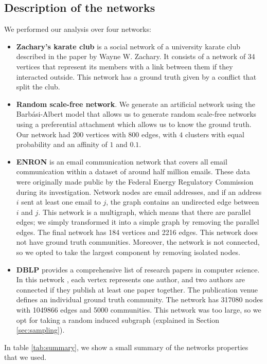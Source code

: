 \subsection{Description of the networks}
We performed our analysis over four networks:
\begin{itemize}
    \item \textbf{Zachary's karate club} is a social network of a university karate club described in the paper \cite{Zachary1977} by Wayne W. Zachary. It consists of a network of 34 vertices that represent its members with a link between them if they interacted outside. This network has a ground truth given by a conflict that split the club.
    \item \textbf{Random scale-free network}. We generate an artificial network using the Barbási-Albert model \cite{Albert2002} that allows us to generate random scale-free networks using a preferential attachment which allows us to know the ground truth. Our network had 200 vertices with 800 edges, with $4$ clusters with equal probability and an affinity of $1$ and $0.1$. 
    \item \textbf{ENRON} \cite{Klimt2004} is an email communication network that covers all email communication within a dataset of around half million emails. These data were originally made public by the Federal Energy Regulatory Commission during its investigation. Network nodes are email addresses, and if an address $i$ sent at least one email to $j$, the graph contains an undirected edge between $i$ and $j$. This network is a multigraph, which means that there are parallel edges; we simply transformed it into a simple graph by removing the parallel edges. The final network has 184 vertices and 2216 edges. This network does not have ground truth communities. Moreover, the network is not connected, so we opted to take the largest component by removing isolated nodes.
    \item \textbf{DBLP} provides a comprehensive list of research papers in computer science. In this network \cite{Yang2012, snapnets}, each vertex represents one author, and two authors are connected if they publish at least one paper together. The publication venue defines an individual ground truth community. The network has 317080 nodes with 1049866 edges and 5000 communities. This network was too large, so we opt for taking a random induced subgraph (explained in Section \ref{sec:sampling}).
\end{itemize}

In table \ref{tab:summary}, we show a small summary of the networks properties that we used.

